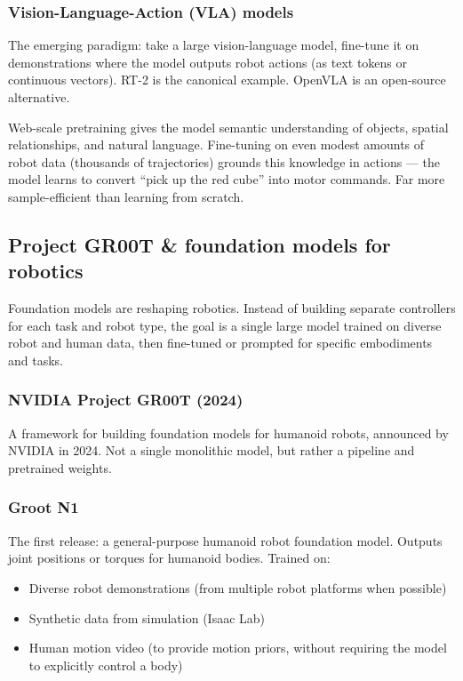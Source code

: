 \subsubsection{Vision-Language-Action (VLA) models}

The emerging paradigm: take a large vision-language model, fine-tune it on demonstrations where the model outputs robot actions (as text tokens or continuous vectors). RT-2 is the canonical example. OpenVLA is an open-source alternative.

\begin{paperbox}[title={Why VLAs work}]
Web-scale pretraining gives the model semantic understanding of objects, spatial relationships, and natural language. Fine-tuning on even modest amounts of robot data (thousands of trajectories) grounds this knowledge in actions — the model learns to convert ``pick up the red cube'' into motor commands. Far more sample-efficient than learning from scratch.
\end{paperbox}

\subsection{Project GR00T \& foundation models for robotics}

\begin{intuitionbox}
Foundation models are reshaping robotics. Instead of building separate controllers for each task and robot type, the goal is a single large model trained on diverse robot and human data, then fine-tuned or prompted for specific embodiments and tasks.
\end{intuitionbox}

\subsubsection{NVIDIA Project GR00T (2024)}

A framework for building foundation models for humanoid robots, announced by NVIDIA in 2024. Not a single monolithic model, but rather a pipeline and pretrained weights.

\subsubsection{Groot N1}

The first release: a general-purpose humanoid robot foundation model. Outputs joint positions or torques for humanoid bodies. Trained on:
\begin{itemize}
\item Diverse robot demonstrations (from multiple robot platforms when possible)
\item Synthetic data from simulation (Isaac Lab)
\item Human motion video (to provide motion priors, without requiring the model to explicitly control a body)
\end{itemize}

